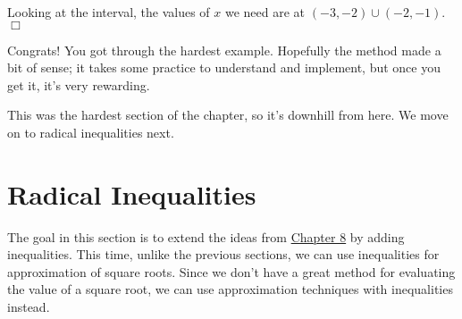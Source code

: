 \documentclass[lang=en,11pt]{elegantbook}
\begin{document}
\begin{solution}
\begin{figure}[!h]
    \centering
\end{figure}
Looking at the interval, the values of $x$ we need are at $(-3,-2)\cup(-2,-1)$. $\Box$
\end{solution}
Congrats! You got through the hardest example.  Hopefully the method made a bit of sense; it takes some practice to understand and implement, but once you get it, it's very rewarding.

This was the hardest section of the chapter, so it's downhill from here.  We move on to radical inequalities next.
\section{Radical Inequalities}
\noindent The goal in this section is to extend the ideas from \hyperlink{chapter.8}{Chapter 8} by adding inequalities.  This time, unlike the previous sections, we can use inequalities for approximation of square roots.  Since we don't have a great method for evaluating the value of a square root, we can use approximation techniques with inequalities instead.
\end{document}
